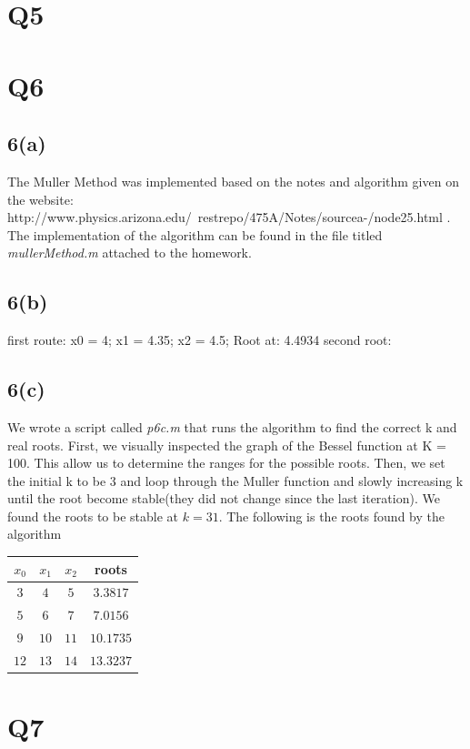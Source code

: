 \documentclass{article}
\begin{document}
\section{Q5}
\section{Q6}
\subsection{6(a)}
The Muller Method was implemented based on the notes and algorithm given on the website: http://www.physics.arizona.edu/~restrepo/475A/Notes/sourcea-/node25.html . The implementation of the algorithm can be found in the file titled \textit{mullerMethod.m} attached to the homework.
\subsection{6(b)}
first route:
x0 = 4;
x1 = 4.35;
x2 = 4.5;
Root at: 4.4934
second root:
\subsection{6(c)}
We wrote a script called \textit{p6c.m} that runs the algorithm to find the correct k and real roots. First, we visually inspected the graph of the Bessel function at K = 100. This allow us to determine the ranges for the possible roots. Then, we set the initial k to be 3 and loop through the Muller function and slowly increasing k until the root become stable(they did not change since the last iteration). We found the roots to be stable at $k = 31$. The following is the roots found by the algorithm\\
\begin{tabular}{|c|c|c|c|}
\hline
$x_0$ & $x_1$ & $x_2$ & roots \\ \hline
$3$ & $4$ & $5$ & $3.3817$ \\ \hline
$5$ & $6$ & $7$ & $7.0156$ \\ \hline
$9$ & $10$ & $11$ & $10.1735$ \\ \hline
$12$ & $13$ & $14$ & $13.3237$ \\ \hline

\end{tabular}

\section{Q7}
\end{document}
